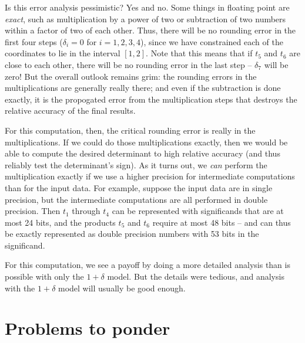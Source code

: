 \documentclass[12pt, leqno]{article}
\begin{document}
Is this error analysis pessimistic?  Yes and no.  Some things in
floating point are {\em exact}, such as multiplication by a power of
two or subtraction of two numbers within a factor of two of each
other.  Thus, there will be no rounding error in the first four steps
($\delta_i = 0$ for $i = 1, 2, 3, 4$), since we have constrained each
of the coordinates to lie in the interval $[1,2]$.  Note that this
means that if $t_5$ and $t_6$ are close to each other, there will be
no rounding error in the last step -- $\delta_7$ will be zero!  But
the overall outlook remains grim: the rounding errors in the
multiplications are generally really there; and even if the
subtraction is done exactly, it is the propogated error from the
multiplication steps that destroys the relative accuracy of the final
results.

For this computation, then, the critical rounding error is really in
the multiplications.  If we could do those multiplications exactly,
then we would be able to compute the desired determinant to high relative
accuracy (and thus reliably test the determinant's sign).  As it turns
out, we {\em can} perform the multiplication exactly if we use a higher
precision for intermediate computations than for the input data.
For example, suppose the input data are in single precision, but the
intermediate computations are all performed in double precision.
Then  $t_1$ through $t_4$ can be represented with significands that are at most
24 bits, and the products $t_5$ and $t_6$ require at most 48 bits --
and can thus be exactly represented as double precision numbers with
53 bits in the significand.

For this computation, we see a payoff by doing a more detailed analysis
than is possible with only the $1+\delta$ model.  But the details
were tedious, and analysis with the $1+\delta$ model will usually
be good enough.

\section*{Problems to ponder}
\end{document}
